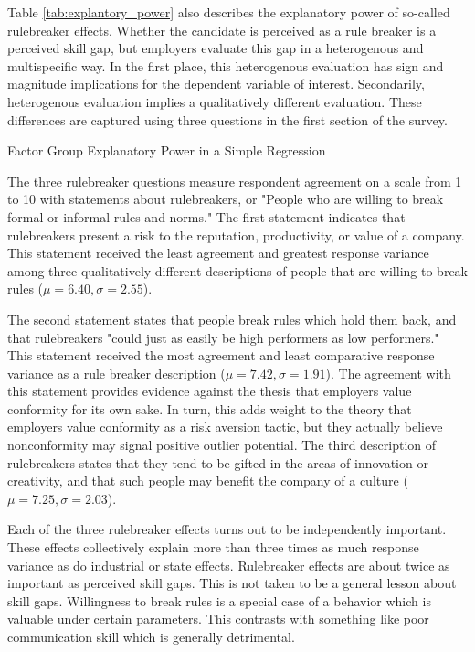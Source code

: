 \documentclass[review]{elsarticle}
\begin{document}
Table \ref{tab:explantory_power} also describes the explanatory power of so-called rulebreaker effects.
Whether the candidate is perceived as a rule breaker is a perceived skill gap, but employers evaluate this gap in a heterogenous and multispecific way.
In the first place, this heterogenous evaluation has sign and magnitude implications for the dependent variable of interest.
Secondarily, heterogenous evaluation implies a qualitatively different evaluation.
These differences are captured using three questions in the first section of the survey.

\begin{table}
    \caption{Factor Group Explanatory Power in a Simple Regression}
    \resizebox{\columnwidth}{!}{
        
    }
    \label{tab:explantory_power}
\end{table}

The three rulebreaker questions measure respondent agreement on a scale from 1 to 10 with statements about rulebreakers, or "People who are willing to break formal or informal rules and norms."
The first statement indicates that rulebreakers present a risk to the reputation, productivity, or value of a company.
This statement received the least agreement and greatest response variance among three qualitatively different descriptions of people that are willing to break rules ($\mu = 6.40, \sigma = 2.55$).

The second statement states that people break rules which hold them back, and that rulebreakers "could just as easily be high performers as low performers."
This statement received the most agreement and least comparative response variance as a rule breaker description ($\mu = 7.42, \sigma = 1.91$).
The agreement with this statement provides evidence against the thesis that employers value conformity for its own sake.
In turn, this adds weight to the theory that employers value conformity as a risk aversion tactic, but they actually believe nonconformity may signal positive outlier potential.
The third description of rulebreakers states that they tend to be gifted in the areas of innovation or creativity, and that such people may benefit the company of a culture ($\mu = 7.25, \sigma = 2.03$).

Each of the three rulebreaker effects turns out to be independently important.
These effects collectively explain more than three times as much response variance as do industrial or state effects.
Rulebreaker effects are about twice as important as perceived skill gaps.
This is not taken to be a general lesson about skill gaps.
Willingness to break rules is a special case of a behavior which is valuable under certain parameters.
This contrasts with something like poor communication skill which is generally detrimental.
\end{document}
